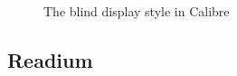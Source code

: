 \begin{figure}[H]
	\centering
	\caption{The blind display style in Calibre}
	\label{fig:calibreBl}
\end{figure}

\subsection{Readium}

